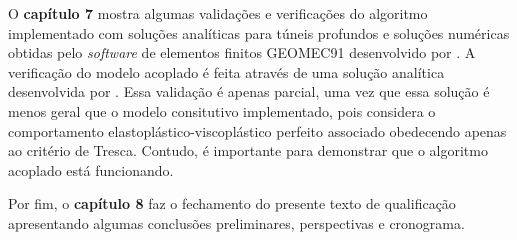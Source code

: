 O \textbf{capítulo 7} mostra algumas validações e verificações do algoritmo implementado com soluções analíticas para túneis profundos e soluções numéricas obtidas pelo \textit{software} de elementos finitos GEOMEC91 desenvolvido por . A verificação do modelo acoplado é feita através de uma solução analítica desenvolvida por . Essa validação é apenas parcial, uma vez que essa solução é menos geral que o modelo consitutivo implementado, pois considera o comportamento elastoplástico-viscoplástico perfeito associado obedecendo apenas ao critério de Tresca. Contudo, é importante para demonstrar que o algoritmo acoplado está funcionando.

Por fim, o \textbf{capítulo 8} faz o fechamento do presente texto de qualificação apresentando algumas conclusões preliminares, perspectivas e cronograma.


 
